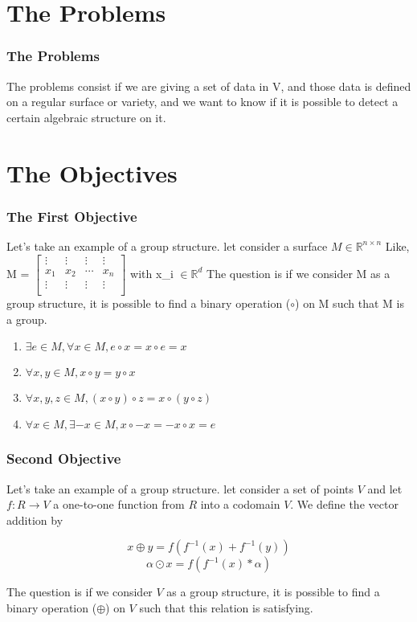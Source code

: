 \documentclass[11pt]{beamer}
\begin{document}


\section{The Problems}
\begin{frame}
    \frametitle{The Problems}
    The problems consist if we are giving a set of data in V, and those data is defined on a regular surface or variety, and we want to know if it is possible to detect a certain algebraic structure on it.
\end{frame}

\section{The Objectives}
\begin{frame}
        \frametitle{The First Objective}
    Let's take an example of a group structure.
    let consider a surface $M \in \mathbb{R}^{n \times n}$
    Like, 
    M = 
    $\begin{bmatrix}
        \vdots & \vdots & \vdots &\vdots \\
        x_{1} & x_{2} & \cdots & x_{n} \\
        \vdots & \vdots & \vdots &\vdots \\
    \end{bmatrix}$
    with x_{i} $\in \mathbb{R}^{d}$
    The question is if we consider M as a group structure, it is possible to find a binary operation ($\circ$) on M such that M is a group.
    \begin{enumerate}
        \item $\exists e \in M, \forall x \in M, e \circ x = x \circ e = x$
        \item $\forall{} x,y \in{} M, x \circ y = y \circ x$
        \item $\forall x,y,z \in M, (x \circ y) \circ z = x \circ (y \circ z)$
        \item $\forall x \in M, \exists -x \in M, x \circ -x = -x \circ x = e$
    \end{enumerate}
\end{frame}







\begin{frame}
    \frametitle{Second Objective}
	Let's take an example of a group structure.
	let consider a set of points  $ V $ and let  $ f: R \rightarrow V $ a one-to-one
	function from $R$ into a codomain $V$. We define the vector addition by
	
     $$ x \oplus y = f(f^{-1}(x) + f^{-1}(y)) $$
     $$ \alpha \odot x = f(f^{-1}(x) * \alpha) $$
		


	The question is if we consider $V$ as a group structure, it is possible to find a binary operation ($\oplus$) on $V$ such that this relation is satisfying.
	
\end{frame}
\end{document}
